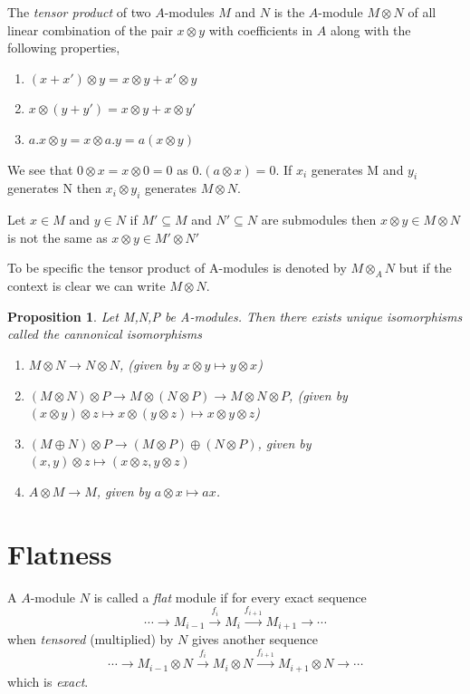 \documentclass[]{report}
\newtheorem{prop}[theorem]{Proposition}
\begin{document}
The \textit{tensor product} of two $A$-modules $M$ and $N$ is the $A$-module $M\otimes N$ of all linear combination of the pair $x \otimes y$ with coefficients in $A$ along with the following properties,
\begin{enumerate}
    \item $(x + x') \otimes y = x \otimes y + x' \otimes y$
    \item $x \otimes (y + y') = x \otimes y + x \otimes y'$
    \item $a.x \otimes y = x \otimes a.y = a(x \otimes y)$
\end{enumerate}

We see that $0 \otimes x = x\otimes 0 = 0$ as $0.(a\otimes x) = 0$. If $x_i$ generates M and $y_i$ generates N then $x_i \otimes y_i$ generates $M\otimes N$. 

Let $x\in M$ and $y\in N$ if $M' \subseteq M$ and $N'\subseteq N$ are submodules then $x\otimes y \in M\otimes N$ is not the same as $x\otimes y \in M'\otimes N'$ 

To be specific the tensor product of A-modules is denoted by $M \otimes_A N$ but if the context is clear we can write $M\otimes N$.

\begin{prop} \cite{atiyah1}
    Let M,N,P be A-modules. Then there exists unique isomorphisms called the cannonical isomorphisms 
    \begin{enumerate}
        \item $M\otimes N \rightarrow N\otimes N$, (given by $x\otimes y \mapsto y\otimes x$)
        \item $(M\otimes N) \otimes P \rightarrow M\otimes (N\otimes P) \rightarrow M\otimes N\otimes P$, (given by $(x\otimes y) \otimes z \mapsto x \otimes (y\otimes z) \mapsto x\otimes y \otimes z$)
        \item $(M\oplus N) \otimes P \rightarrow (M\otimes P) \oplus (N\otimes P)$, given by $(x,y)\otimes z \mapsto (x\otimes z, y\otimes z)$
        \item $A\otimes M \rightarrow M$, given by $a\otimes x \mapsto ax$. 
    \end{enumerate}
\end{prop}
    
\section{Flatness}

A $A$-module $N$ is called a \textit{flat} module if for every exact sequence
$$\cdots \rightarrow M_{i-1} \xrightarrow{f_i} M_i \xrightarrow{f_{i+1}} M_{i+1} \rightarrow \cdots$$ 
when \textit{tensored} (multiplied) by $N$ gives another sequence
$$\cdots \rightarrow M_{i-1}\otimes N \xrightarrow{f_i} M_i\otimes N \xrightarrow{f_{i+1}} M_{i+1}\otimes N \rightarrow \cdots$$ 
which is \textit{exact}.
\end{document}
